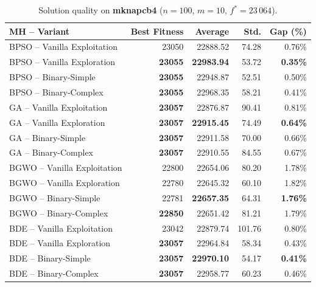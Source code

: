 \documentclass[journal,article,submit,moreauthors]{Definitions/mdpi}
\begin{document}
\begin{table}[htbp]
  \centering
  \small
  \caption{Solution quality on \textbf{mknapcb4}
  ($n=100$, $m=10$, $f^*=23\,064$).}
  \label{tab:calidad_mknapcb4}
  \begin{tabular}{lrrrr}
    \toprule
    \textbf{MH -- Variant} &
    \textbf{Best Fitness} &
    \textbf{Average} &
    \textbf{Std.} &
    \textbf{Gap (\%)} \\
    \midrule
    BPSO -- Vanilla Exploitation & 23050 & 22888.52 & 74.28 & 0.76\% \\
    BPSO -- Vanilla Exploration  & \textbf{23055} & \textbf{22983.94} & 53.72 & \textbf{0.35\%} \\
    BPSO -- Binary-Simple        & \textbf{23055} & 22948.87 & 52.51 & 0.50\% \\
    BPSO -- Binary-Complex       & \textbf{23055} & 22968.35 & 58.21 & 0.41\% \\
    \midrule
    GA -- Vanilla Exploitation   & \textbf{23057} & 22876.87 & 90.41 & 0.81\% \\
    GA -- Vanilla Exploration    & \textbf{23057} & \textbf{22915.45} & 74.49 & \textbf{0.64\%} \\
    GA -- Binary-Simple          & \textbf{23057} & 22911.58 & 70.00 & 0.66\% \\
    GA -- Binary-Complex         & \textbf{23057} & 22910.55 & 84.55 & 0.67\% \\
    \midrule
    BGWO -- Vanilla Exploitation & 22800 & 22654.06 & 80.20 & 1.78\% \\
    BGWO -- Vanilla Exploration  & 22780 & 22645.32 & 60.10 & 1.82\% \\
    BGWO -- Binary-Simple        & 22781 & \textbf{22657.35} & 64.31 & \textbf{1.76\%} \\
    BGWO -- Binary-Complex       & \textbf{22850} & 22651.42 & 81.21 & 1.79\% \\
    \midrule
    BDE -- Vanilla Exploitation  & 23042 & 22879.74 & 101.76 & 0.80\% \\
    BDE -- Vanilla Exploration   & \textbf{23057} & 22964.84 & 58.34 & 0.43\% \\
    BDE -- Binary-Simple         & \textbf{23057} & \textbf{22970.10} & 54.17 & \textbf{0.41\%} \\
    BDE -- Binary-Complex        & \textbf{23057} & 22958.77 & 60.23 & 0.46\% \\
    \bottomrule
  \end{tabular}
\end{table}
\end{document}
